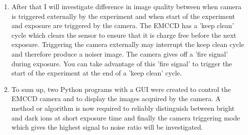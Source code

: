 \documentclass[12pt]{article}
\begin{document}
\begin{enumerate}
\item After that I will investigate difference in image quality between when camera is triggered externally by the experiment and when start of the experiment and exposure are triggered by the camera. The EMCCD has a 'keep clean' cycle which clears the sensor to ensure that it is charge free before the next exposure. Triggering the camera externally may interrupt the keep clean cycle and therefore produce a noiser image. The camera gives off a 'fire signal' during exposure. You can take advantage of this 'fire signal' to trigger the start of the experiment at the end of a 'keep clean' cycle.

\item To sum up, two Python programs with a GUI were created to control the EMCCD camera and to display the images acquired by the camera. A method or algorithm is now required to reliably distinguish between bright and dark ions at short exposure time and finally the camera triggering mode which gives the highest signal to noise ratio will be investigated.

\end{enumerate}
\end{document}
